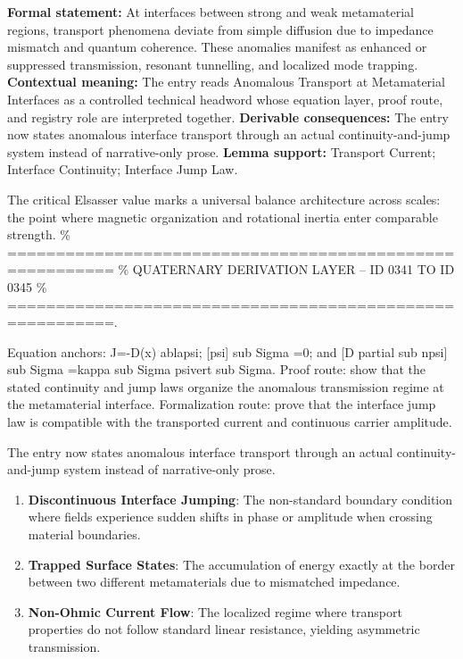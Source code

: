 \begingroup\footnotesize\setlength{\emergencystretch}{3em}\sloppy
\textbf{Formal statement:} At interfaces between strong and weak metamaterial regions, transport phenomena deviate from simple diffusion due to impedance mismatch and quantum coherence. These anomalies manifest as enhanced or suppressed transmission, resonant tunnelling, and localized mode trapping. \textbf{Contextual meaning:} The entry reads Anomalous Transport at Metamaterial Interfaces as a controlled technical headword whose equation layer, proof route, and registry role are interpreted together. \textbf{Derivable consequences:} The entry now states anomalous interface transport through an actual continuity-and-jump system instead of narrative-only prose. \textbf{Lemma support:} Transport Current; Interface Continuity; Interface Jump Law.\par
\endgroup

The critical Elsasser value marks a universal balance architecture across scales: the point where magnetic organization and rotational inertia enter comparable strength. \% ========================================================= \% QUATERNARY DERIVATION LAYER -- ID 0341 TO ID 0345 \% =========================================================.

Equation anchors: J=-D(x) ablapsi; [psi] sub Sigma =0; and [D partial sub npsi] sub Sigma =kappa sub Sigma psivert sub Sigma. Proof route: show that the stated continuity and jump laws organize the anomalous transmission regime at the metamaterial interface. Formalization route: prove that the interface jump law is compatible with the transported current and continuous carrier amplitude.

The entry now states anomalous interface transport through an actual continuity-and-jump system instead of narrative-only prose.
\endgroup

\begin{enumerate}[leftmargin=1.6em,itemsep=6pt,topsep=4pt]
\item \textbf{Discontinuous Interface Jumping}: The non-standard boundary condition where fields experience sudden shifts in phase or amplitude when crossing material boundaries.
\item \textbf{Trapped Surface States}: The accumulation of energy exactly at the border between two different metamaterials due to mismatched impedance.
\item \textbf{Non-Ohmic Current Flow}: The localized regime where transport properties do not follow standard linear resistance, yielding asymmetric transmission.
\end{enumerate}

